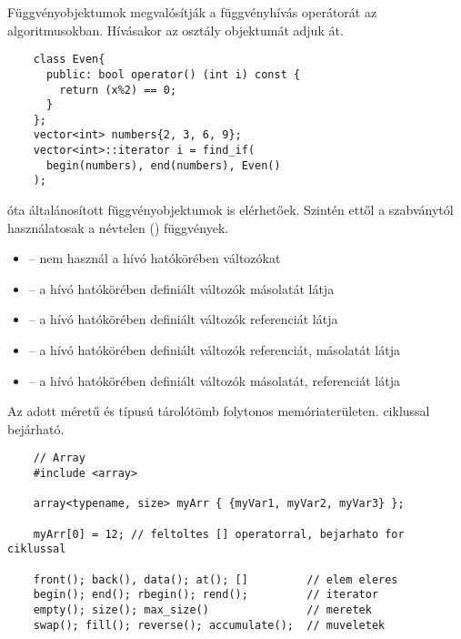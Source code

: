 \documentclass[main.tex]{subfiles}
\begin{document}
  Függvényobjektumok megvalósítják a függvényhívás
  \kkod{()} operátorát az algoritmusokban.
  Hívásakor az osztály objektumát adjuk át.
  \begin{lstlisting}
    class Even{
      public: bool operator() (int i) const {
        return (x%2) == 0;
      }
    };
    vector<int> numbers{2, 3, 6, 9};
    vector<int>::iterator i = find_if(
      begin(numbers), end(numbers), Even()
    );
  \end{lstlisting}
   óta általánosított függvényobjektumok
  is elérhetőek. Szintén ettől a szabványtól használatosak
  a névtelen () függvények.
  \begin{itemize}
    \item \kkod{[]\{\};}        \hspace{33pt} – \hspace{8pt}
    nem használ a hívó hatókörében változókat

    \item \kkod{[=]\{\};}       \hspace{27pt} – \hspace{8pt}
    a hívó hatókörében definiált változók másolatát látja
    
    \item \kkod{[\&]\{\};}      \hspace{27pt} – \hspace{8pt}
    a hívó hatókörében definiált változók referenciát látja
    
    \item \kkod{[\&,i]\{\};}  \hspace{15.2pt} – \hspace{8pt}
    a hívó hatókörében definiált változók referenciát,
     másolatát látja
    
    \item \kkod{[=,\&{}i]\{\};}  \hspace{9pt} – \hspace{8pt}
    a hívó hatókörében definiált változók másolatát,
     referenciát látja
  \end{itemize}

  
  Az  adott méretű és típusú tárolótömb
  folytonos memóriaterületen.  ciklussal bejárható.
  \begin{lstlisting}
    // Array
    #include <array>

    array<typename, size> myArr { {myVar1, myVar2, myVar3} };

    myArr[0] = 12; // feltoltes [] operatorral, bejarhato for ciklussal

    front(); back(), data(); at(); []         // elem eleres
    begin(); end(); rbegin(); rend();         // iterator
    empty(); size(); max_size()               // meretek
    swap(); fill(); reverse(); accumulate();  // muveletek
  \end{lstlisting}
\end{document}

